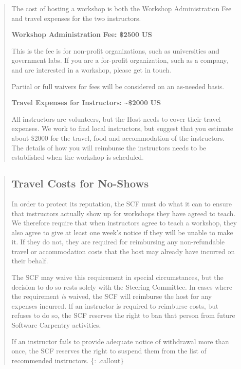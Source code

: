 \begin{quote}
The cost of hosting a workshop is both the Workshop Administration Fee
and travel expenses for the two instructors.

\textbf{Workshop Administration Fee: \$2500 US}

This is the fee is for non-profit organizations, such as universities
and government labs. If you are a for-profit organization, such as a
company, and are interested in a workshop, please get in touch.

Partial or full waivers for fees will be considered on an as-needed
basis.

\textbf{Travel Expenses for Instructors: \textasciitilde{}\$2000 US}

All instructors are volunteers, but the Host needs to cover their travel
expenses. We work to find local instructors, but suggest that you
estimate about \$2000 for the travel, food and accommodation of the
instructors. The details of how you will reimburse the instructors needs
to be established when the workshop is scheduled.
\end{quote}

\begin{quote}
\subsection{Travel Costs for No-Shows}\label{travel-costs-for-no-shows}

In order to protect its reputation, the SCF must do what it can to
ensure that instructors actually show up for workshops they have agreed
to teach. We therefore require that when instructors agree to teach a
workshop, they also agree to give at least one week's notice if they
will be unable to make it. If they do not, they are required for
reimbursing any non-refundable travel or accommodation costs that the
host may already have incurred on their behalf.

The SCF may waive this requirement in special circumstances, but the
decision to do so rests solely with the Steering Committee. In cases
where the requirement \emph{is} waived, the SCF will reimburse the host
for any expenses incurred. If an instructor is required to reimburse
costs, but refuses to do so, the SCF reserves the right to ban that
person from future Software Carpentry activities.

If an instructor fails to provide adequate notice of withdrawal more
than once, the SCF reserves the right to suspend them from the list of
recommended instructors. \{: .callout\}
\end{quote}

